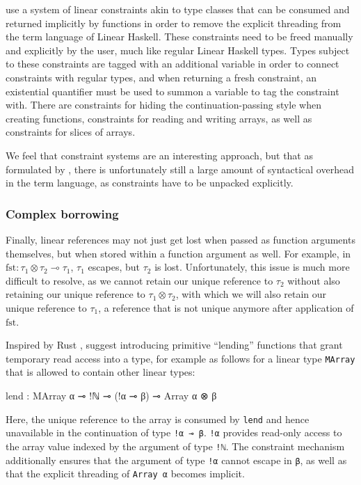 \cite{spiwack_linearly_2022} use a system of linear constraints akin to type classes that can be consumed and returned implicitly by functions in order to remove the explicit threading from the term language of Linear Haskell. These constraints need to be freed manually and explicitly by the user, much like regular Linear Haskell types. Types subject to these constraints are tagged with an additional variable in order to connect constraints with regular types, and when returning a fresh constraint, an existential quantifier must be used to summon a variable to tag the constraint with. There are constraints for hiding the continuation-passing style when creating functions, constraints for reading and writing arrays, as well as constraints for slices of arrays.

We feel that constraint systems are an interesting approach, but that as formulated by \cite{spiwack_linearly_2022}, there is unfortunately still a large amount of syntactical overhead in the term language, as constraints have to be unpacked explicitly.

\subsubsection{Complex borrowing}
Finally, linear references may not just get lost when passed as function arguments themselves, but when stored within a function argument as well. For example, in $\mathrm{fst} : \tau_1 \otimes \tau_2 \multimap \tau_1$, $\tau_1$ escapes, but $\tau_2$ is lost. Unfortunately, this issue is much more difficult to resolve, as we cannot retain our unique reference to $\tau_2$ without also retaining our unique reference to $\tau_1 \otimes \tau_2$, with which we will also retain our unique reference to $\tau_1$, a reference that is not unique anymore after application of $\mathrm{fst}$. 

Inspired by Rust \citep{weiss_oxide_2021}, \cite{spiwack_linearly_2022} suggest introducing primitive ``lending'' functions that grant temporary read access into a type, for example as follows for a linear type \lstinline|MArray| that is allowed to contain other linear types:\\
\begin{code}
lend : MArray α ⊸ !ℕ ⊸ (!α ⊸ β) ⊸ Array α ⊗ β
\end{code}

Here, the unique reference to the array is consumed by \lstinline|lend| and hence unavailable in the continuation of type \lstinline|!α ⊸ β|. \lstinline|!α| provides read-only access to the array value indexed by the argument of type \lstinline|!ℕ|. The constraint mechanism additionally ensures that the argument of type \lstinline|!α| cannot escape in \lstinline|β|, as well as that the explicit threading of \lstinline|Array α| becomes implicit.

